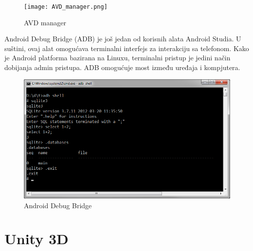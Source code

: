 \documentclass{article}
\begin{document}
\begin{figure}[ht!]
    \centering
    \texttt{[image: AVD\_manager.png]}
    \caption{AVD manager}
\end{figure}

Android Debug Bridge (ADB) je još jedan od korisnih alata Android Studia. U suštini, ovaj alat omogućava terminalni interfejs za interakciju sa telefonom. Kako je Android platforma bazirana na Linuxu, terminalni pristup je jedini način dobijanja admin pristupa. ADB omogućuje most između uređaja i kompjutera.

\begin{figure}[ht!]
    \centering
    \includegraphics[scale=0.1]{adb.png}
    \caption{Android Debug Bridge}
\end{figure}


\section{Unity 3D}
\end{document}
